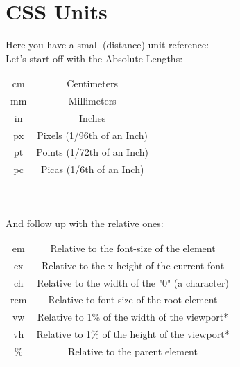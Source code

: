 \documentclass[a4paper,12pt]{article}
\newcommand{\nsp}{\vspace{0.05cm}\\}
\begin{document}
\section{CSS Units}
Here you have a small (distance) unit reference:\\
Let's start off with the Absolute Lengths:\\
\begin{tabular}{|c|c|}
    \hline
    cm & Centimeters                \\
    mm & Millimeters                \\
    in & Inches                     \\
    px & Pixels (1/96th of an Inch) \\
    pt & Points (1/72th of an Inch) \\
    pc & Picas  (1/6th of an Inch)  \\
    \hline
\end{tabular}\nsp\nsp
And follow up with the relative ones:\\
\begin{tabular}{|c|c|}
    \hline
    em & Relative to the font-size of the element       \\
    ex & Relative to the x-height of the current font   \\
    ch & Relative to the width of the "0" (a character) \\
    rem & Relative to font-size of the root element     \\
    vw & Relative to 1\% of the width of the viewport*  \\
    vh & Relative to 1\% of the height of the viewport* \\
    \% &  	Relative to the parent element              \\
    \hline
\end{tabular}
\end{document}
